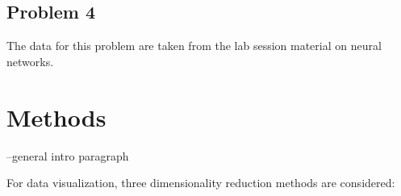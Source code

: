 \documentclass[prl,twocolumn]{revtex4-1}
\begin{document}
\subsection{Problem 4}
\noindent The data for this problem are taken from the lab session material on neural networks.



\section{Methods}

--general intro paragraph

For data visualization, three dimensionality reduction methods are considered:
\end{document}

